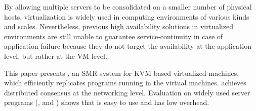 By allowing multiple servers to be consolidated on a smaller number of physical 
hosts, virtualization is widely used in computing environments of various kinds and
scales. Nevertheless, previous high availability solutions in virtualized environments
are still unable to guarantee service-continuity in case of application failure because 
they do not target the availability at the application level, but rather at the VM level.

This paper presents \xxx, an SMR system for KVM based virtualized machines, 
which efficiently replicates programs running in the virtual machines. 
\xxx achieves distributed consensus at the networking level. 
Evaluation on \nprog widely used server programs (\eg, \mysql and \redis) shows 
that \xxx is easy to use and has low overhead.
